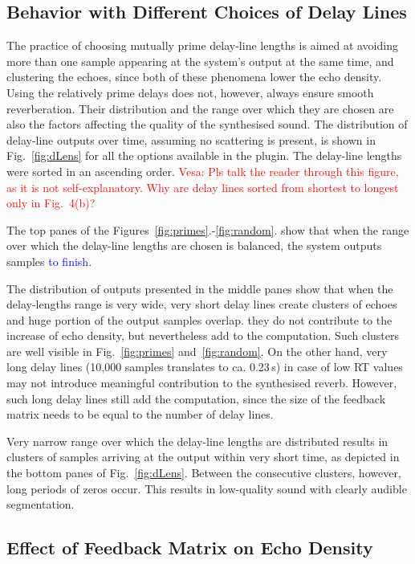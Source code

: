\documentclass[twoside,a4paper]{article}
\newcommand{\karolina}[1]{\textcolor{blue}{#1}}
\newcommand{\vesa}[1]{\textcolor{red}{Vesa: #1}}
\begin{document}
\subsection{Behavior with Different Choices of Delay Lines}
The practice of choosing mutually prime delay-line lengths is aimed at avoiding more than one sample appearing at the system's output at the same time, and clustering the echoes, since both of these phenomena lower the echo density. Using the relatively prime delays does not, however, always ensure smooth reverberation. Their distribution and the range over which they are chosen are also the factors affecting the quality of the synthesised sound. The distribution of delay-line outputs over time, assuming no scattering is present, is shown in Fig.~\ref{fig:dLens} for all the options available in the plugin. The delay-line lengths were sorted in an ascending order. \vesa{Pls talk the reader through this figure, as it is not self-explanatory. Why are delay lines sorted from shortest to longest only in Fig.~4(b)?}

The top panes of the Figures~\ref{fig:primes}.-\ref{fig:random}. show that when the range over which the delay-line lengths are chosen is balanced, the system outputs samples \karolina{to finish}.

The distribution of outputs presented in the middle panes show that when the delay-lengths range is very wide, very short delay lines create clusters of echoes and huge portion of the output samples overlap. they do not contribute to the increase of echo density, but nevertheless add to the computation. Such clusters are well visible in Fig.~\ref{fig:primes} and~\ref{fig:random}. On the other hand, very long delay lines (10,000 samples translates to ca. 0.23\,s) in case of low RT values may not introduce meaningful contribution to the synthesised reverb. However, such long delay lines still add the computation, since the size of the feedback matrix needs to be equal to the number of delay lines. 

Very narrow range over which the delay-line lengths are distributed results in clusters of samples arriving at the output within very short time, as depicted in the bottom panes of Fig.~\ref{fig:dLens}. Between the consecutive clusters, however, long periods of zeros occur. This results in low-quality sound with clearly audible segmentation. 




\subsection{Effect of Feedback Matrix on Echo Density}
\end{document}
